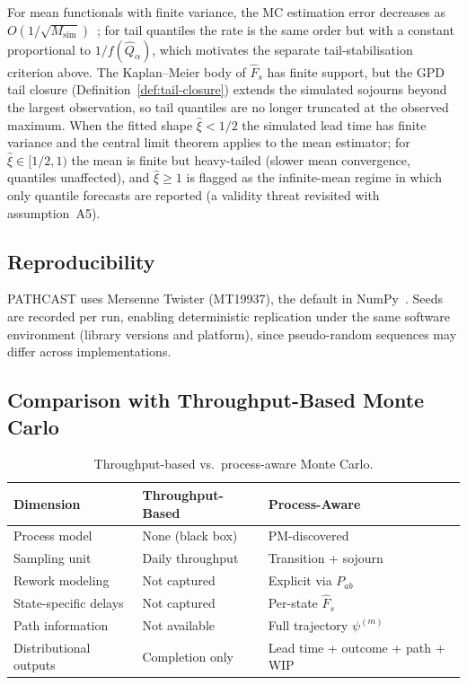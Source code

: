\begin{property}
\label{prop:convergence-rate}
For mean functionals with finite variance, the MC estimation error decreases
as $O(1/\sqrt{M_{\text{sim}}})$~\cite{robert2004monte}; for tail quantiles
the rate is the same order but with a constant proportional to
$1/f(\hat{Q}_\alpha)$, which motivates the separate tail-stabilisation
criterion above. The Kaplan--Meier body of $\hat{F}_s$ has finite support, but the
GPD tail closure (Definition~\ref{def:tail-closure}) extends the simulated
sojourns beyond the largest observation, so tail quantiles are no longer
truncated at the observed maximum. When the fitted shape $\hat{\xi} < 1/2$
the simulated lead time has finite variance and the central limit theorem
applies to the mean estimator; for $\hat{\xi} \in [1/2, 1)$ the mean is
finite but heavy-tailed (slower mean convergence, quantiles unaffected), and
$\hat{\xi} \geq 1$ is flagged as the infinite-mean regime in which only
quantile forecasts are reported (a validity threat revisited with
assumption~A5).
\end{property}


\subsection{Reproducibility}
\label{sec:s4-prng}

PATHCAST uses Mersenne Twister (MT19937), the default in
NumPy~\cite{numpy2020}. Seeds are recorded per run, enabling deterministic
replication under the same software environment (library versions and
platform), since pseudo-random sequences may differ across implementations.


\subsection{Comparison with Throughput-Based Monte Carlo}
\label{sec:s4-comparison}

\begin{table}[htbp]
\centering
\caption{Throughput-based vs.\ process-aware Monte Carlo.}
\label{tab:mc-comparison}
\begin{tabular}{lll}
\toprule
\textbf{Dimension} & \textbf{Throughput-Based} & \textbf{Process-Aware} \\
\midrule
Process model               & None (black box)    & PM-discovered \\
Sampling unit               & Daily throughput    & Transition + sojourn \\
Rework modeling             & Not captured        & Explicit via $P_{ab}$ \\
State-specific delays       & Not captured        & Per-state $\hat{F}_s$ \\
Path information            & Not available       & Full trajectory $\psi^{(m)}$ \\
Distributional outputs      & Completion only     & Lead time + outcome + path + WIP \\
\bottomrule
\end{tabular}
\end{table}

